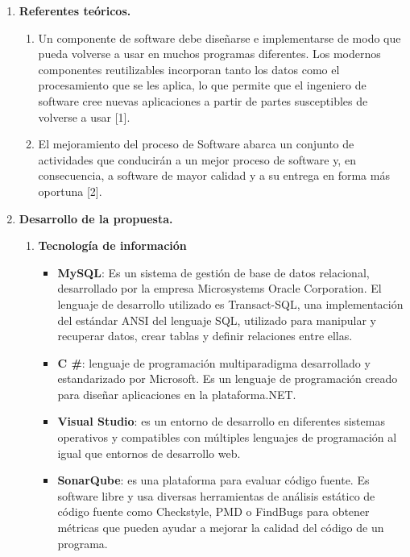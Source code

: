 \documentclass[12pt,a4paper,oneside]{book}
\begin{document}
\begin{enumerate}
\begin{enumerate}
				\end{enumerate}
		\item \textbf{Referentes te\'oricos.}
			 \begin{enumerate}
			  	\item Un componente de software debe diseñarse e implementarse de modo que pueda volverse a usar en muchos programas diferentes. Los modernos componentes reutilizables incorporan tanto los datos como el procesamiento que se les aplica, lo que permite que el ingeniero de software cree nuevas aplicaciones a partir de partes susceptibles de volverse a usar [1].\\
			  	
			  	\item El mejoramiento del proceso de Software abarca un conjunto de actividades que conducirán a un mejor proceso de software y, en consecuencia, a software de mayor calidad y a su entrega en forma más oportuna [2]. 
			  	
			  \end{enumerate}
		\item \textbf{Desarrollo de la propuesta.}
			\begin{enumerate}
				\item \textbf{Tecnolog\'ia de informaci\'on }
					\begin{itemize}
						 
						\item \textbf{MySQL}: Es un sistema de gestión de base de datos relacional, desarrollado por la empresa Microsystems Oracle Corporation. El lenguaje de desarrollo utilizado es Transact-SQL, una implementación del estándar ANSI del lenguaje SQL, utilizado para manipular y recuperar datos, crear tablas y definir relaciones entre ellas.
						
						\item \textbf{C \#}: lenguaje de programación multiparadigma desarrollado y estandarizado por Microsoft. Es un lenguaje de programación creado para diseñar aplicaciones en la plataforma.NET.
						
						\item \textbf{Visual Studio}: es un entorno de desarrollo en diferentes sistemas operativos y compatibles con múltiples lenguajes de programación al igual que entornos de desarrollo web.
						
						\item \textbf{SonarQube}: es una plataforma para evaluar código fuente. Es software libre y usa diversas herramientas de análisis estático de código fuente como Checkstyle, PMD o FindBugs para obtener métricas que pueden ayudar a mejorar la calidad del código de un programa. 
						

\end{itemize}
\end{enumerate}
\end{enumerate}
\end{document}
